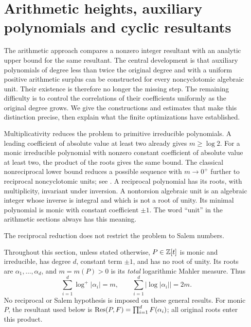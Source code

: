 \section{Arithmetic heights, auxiliary polynomials and cyclic resultants}
\label{sec:arithmetic}

The arithmetic approach compares a nonzero integer resultant with an analytic upper bound for the same resultant.
The central development is that auxiliary polynomials of degree less than twice the original degree and with a uniform positive arithmetic surplus can be constructed for every noncyclotomic algebraic unit.
Their existence is therefore no longer the missing step.
The remaining difficulty is to control the correlations of their coefficients uniformly as the original degree grows.
We give the constructions and estimates that make this distinction precise, then explain what the finite optimizations have established.

Multiplicativity reduces the problem to primitive irreducible polynomials.
A leading coefficient of absolute value at least two already gives $m\ge\log2$.
For a monic irreducible polynomial with nonzero constant coefficient of absolute value at least two, the product of the roots gives the same bound.
The classical nonreciprocal lower bound reduces a possible sequence with $m\to0^+$ further to reciprocal noncyclotomic units; see \citet[\S5.1]{Smy08}.
A reciprocal polynomial has its roots, with multiplicity, invariant under inversion.
A nontorsion algebraic unit is an algebraic integer whose inverse is integral and which is not a root of unity.
Its minimal polynomial is monic with constant coefficient $\pm1$.
The word ``unit'' in the arithmetic sections always has this meaning.

The reciprocal reduction does not restrict the problem to Salem numbers.

Throughout this section, unless stated otherwise, $P\in\mathbb Z[t]$ is monic and irreducible, has degree $d$, constant term $\pm1$, and has no root of unity.
Its roots are $\alpha_1,\ldots,\alpha_d$, and $m=m(P)>0$ is its \emph{total} logarithmic Mahler measure.
Thus
\begin{equation}
 \sum_{i=1}^d\log^+|\alpha_i|=m,
 \qquad \sum_{i=1}^d\bigl|\log|\alpha_i|\bigr|=2m.
 \label{ar:unit-radial}
\end{equation}
No reciprocal or Salem hypothesis is imposed on these general results.
For monic $P$, the resultant used below is $\operatorname{Res}(P,F)=\prod_{i=1}^d F(\alpha_i)$; all original roots enter this product.


